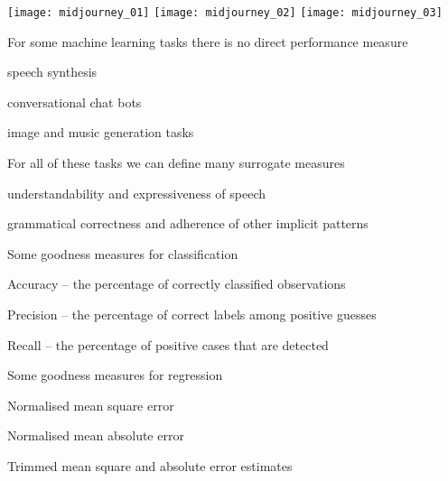 \documentclass[landscape,footrule]{foils}
\begin{document}
\titlefoil


\centerline{
\texttt{[image: midjourney\_01]}\hspace*{0.5cm}
\texttt{[image: midjourney\_02]}\hspace*{0.5cm}
\texttt{[image: midjourney\_03]}\hspace*{0.5cm}
}

For some machine learning tasks there is no direct performance measure
\begin{triangles}
\item speech synthesis
\item conversational chat bots
\item image and music generation tasks
\end{triangles}
\vspace*{1cm}

For all of these tasks we can define many surrogate measures
\begin{triangles}
\item understandability and expressiveness of speech
\item grammatical correctness and adherence of other implicit patterns  
\end{triangles}   


Some goodness measures for classification
\begin{triangles}
\item Accuracy -- the percentage of correctly classified observations
\item Precision -- the percentage of correct labels among positive guesses 
\item Recall -- the percentage of positive cases that are detected
\end{triangles}
\vspace*{1cm}

Some goodness measures for regression
\begin{triangles}
\item Normalised mean square error
\item Normalised mean absolute error
\item Trimmed mean square and absolute error estimates  
\end{triangles}


\end{document}
